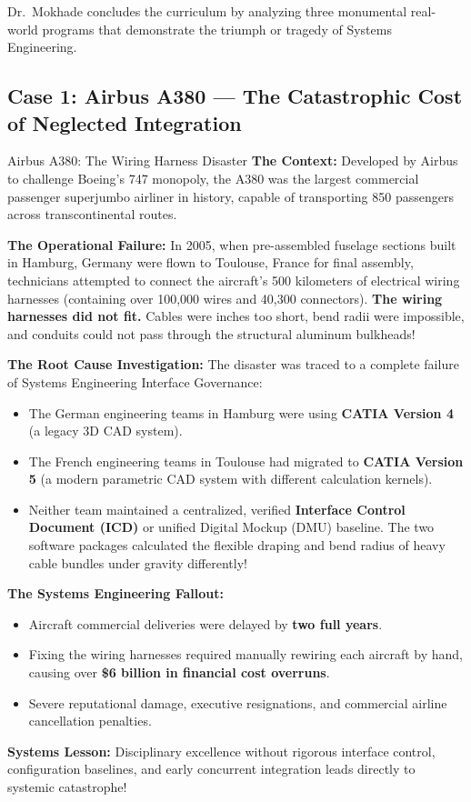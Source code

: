 Dr.~Mokhade concludes the curriculum by analyzing three monumental real-world programs that demonstrate the triumph or tragedy of Systems Engineering.

\subsection{Case 1: Airbus A380 --- The Catastrophic Cost of Neglected Integration}
\begin{storybox}{Airbus A380: The Wiring Harness Disaster}
\textbf{The Context:} Developed by Airbus to challenge Boeing's 747 monopoly, the A380 was the largest commercial passenger superjumbo airliner in history, capable of transporting 850 passengers across transcontinental routes.

\textbf{The Operational Failure:} In 2005, when pre-assembled fuselage sections built in Hamburg, Germany were flown to Toulouse, France for final assembly, technicians attempted to connect the aircraft's 500 kilometers of electrical wiring harnesses (containing over 100,000 wires and 40,300 connectors). 
\textbf{The wiring harnesses did not fit.} Cables were inches too short, bend radii were impossible, and conduits could not pass through the structural aluminum bulkheads!

\textbf{The Root Cause Investigation:}
The disaster was traced to a complete failure of Systems Engineering Interface Governance:
\begin{itemize}[leftmargin=1.5em]
    \item The German engineering teams in Hamburg were using \textbf{CATIA Version 4} (a legacy 3D CAD system).
    \item The French engineering teams in Toulouse had migrated to \textbf{CATIA Version 5} (a modern parametric CAD system with different calculation kernels).
    \item Neither team maintained a centralized, verified \textbf{Interface Control Document (ICD)} or unified Digital Mockup (DMU) baseline. The two software packages calculated the flexible draping and bend radius of heavy cable bundles under gravity differently!
\end{itemize}

\textbf{The Systems Engineering Fallout:}
\begin{itemize}[leftmargin=1.5em]
    \item Aircraft commercial deliveries were delayed by \textbf{two full years}.
    \item Fixing the wiring harnesses required manually rewiring each aircraft by hand, causing over \textbf{\$6 billion in financial cost overruns}.
    \item Severe reputational damage, executive resignations, and commercial airline cancellation penalties.
\end{itemize}
\textbf{Systems Lesson:} Disciplinary excellence without rigorous interface control, configuration baselines, and early concurrent integration leads directly to systemic catastrophe!
\end{storybox}

